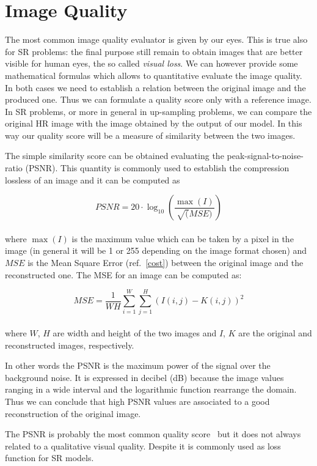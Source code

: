 \documentclass{standalone}
\begin{document}
\section[Image Quality]{Image Quality}\label{quality}

The most common image quality evaluator is given by our eyes.
This is true also for SR problems: the final purpose still remain to obtain images that are better visible for human eyes, the so called \emph{visual loss}.
We can however provide some mathematical formulas which allows to quantitative evaluate the image quality.
In both cases we need to establish a relation between the original image and the produced one.
Thus we can formulate a quality score only with a reference image.
In SR problems, or more in general in up-sampling problems, we can compare the original HR image with the image obtained by the output of our model.
In this way our quality score will be a measure of similarity between the two images.

The simple similarity score can be obtained evaluating the peak-signal-to-noise-ratio (PSNR).
This quantity is commonly used to establish the compression lossless of an image and it can be computed as

$$
PSNR = 20 \cdot \log_{10}\left( \frac{\max(I)}{\sqrt(MSE)} \right)
$$
\\
where $\max(I)$ is the maximum value which can be taken by a pixel in the image (in general it will be 1 or 255 depending on the image format chosen) and $MSE$ is the Mean Square Error (ref.~\ref{cost}) between the original image and the reconstructed one.
The MSE for an image can be computed as:

$$
MSE = \frac{1}{WH} \sum_{i=1}^{W}\sum_{j=1}^{H} \left( I(i, j) - K(i, j) \right)^2
$$
\\
where $W$, $H$ are width and height of the two images and $I$, $K$ are the original and reconstructed images, respectively.

In other words the PSNR is the maximum power of the signal over the background noise.
It is expressed in decibel (dB) because the image values ranging in a wide interval and the logarithmic function rearrange the domain.
Thus we can conclude that high PSNR values are associated to a good reconstruction of the original image.

The PSNR is probably the most common quality score~\cite{psnr_ssim} but it does not always related to a qualitative visual quality.
Despite it is commonly used as loss function for SR models.
\end{document}
